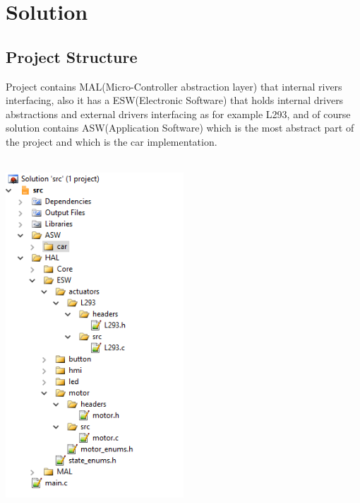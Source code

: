 \section{Solution}

\subsection{Project Structure}
Project contains MAL(Micro-Controller abstraction layer) that internal rivers interfacing, also it has a ESW(Electronic Software) that holds internal drivers abstractions and external drivers interfacing as for example L293, and of course solution contains ASW(Application Software) which is the most abstract part of the project and which is the car implementation.\\\\
\centerline{
	\includegraphics[width=0.5\textwidth]{solution/images/src.png}
}


\newpage

